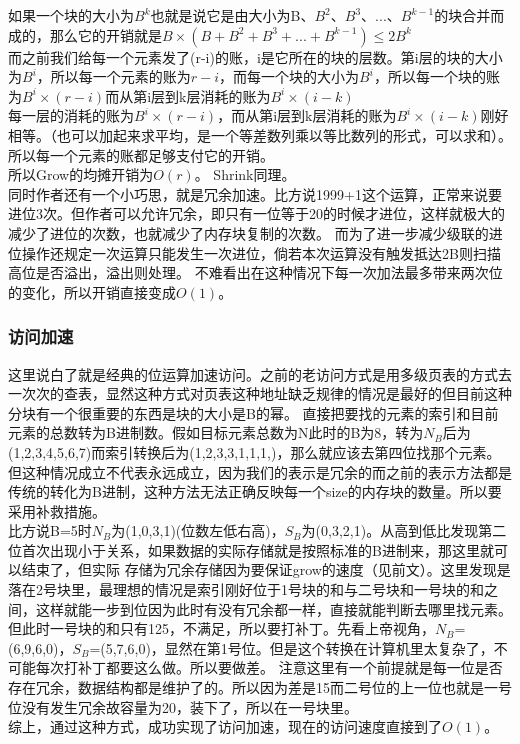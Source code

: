 \documentclass[12pt,a4paper]{article}
\begin{document}
如果一个块的大小为$B^{k}$也就是说它是由大小为B、$B^{2}$、$B^{3}$、...、$B^{k-1}$的块合并而成的，那么它的开销就是$B\times (B+B^{2}+B^{3}+...+B^{k-1})\le2B^{k}$\\
而之前我们给每一个元素发了(r-i)的账，i是它所在的块的层数。第i层的块的大小为$B^{i}$，所以每一个元素的账为$r-i$，而每一个块的大小为$B^{i}$，所以每一个块的账为$B^{i}\times (r-i)$而从第i层到k层消耗的账为$B^{i}\times (i-k)$\\
每一层的消耗的账为$B^{i}\times (r-i)$，而从第i层到k层消耗的账为$B^{i}\times (i-k)$刚好相等。（也可以加起来求平均，是一个等差数列乘以等比数列的形式，可以求和）。
所以每一个元素的账都足够支付它的开销。\\
所以Grow的均摊开销为$O(r)$。
Shrink同理。\\
同时作者还有一个小巧思，就是冗余加速。比方说1999+1这个运算，正常来说要进位3次。但作者可以允许冗余，即只有一位等于20的时候才进位，这样就极大的减少了进位的次数，也就减少了内存块复制的次数。
而为了进一步减少级联的进位操作还规定一次运算只能发生一次进位，倘若本次运算没有触发抵达2B则扫描高位是否溢出，溢出则处理。
不难看出在这种情况下每一次加法最多带来两次位的变化，所以开销直接变成$O(1)$。
\subsubsection{访问加速}
这里说白了就是经典的位运算加速访问。之前的老访问方式是用多级页表的方式去一次次的查表，显然这种方式对页表这种地址缺乏规律的情况是最好的但目前这种分块有一个很重要的东西是块的大小是B的幂。
直接把要找的元素的索引和目前元素的总数转为B进制数。假如目标元素总数为N此时的B为8，转为$N_B$后为(1,2,3,4,5,6,7)而索引转换后为(1,2,3,3,1,1,1,)，那么就应该去第四位找那个元素。
但这种情况成立不代表永远成立，因为我们的表示是冗余的而之前的表示方法都是传统的转化为B进制，这种方法无法正确反映每一个size的内存块的数量。所以要采用补救措施。\\
比方说B=5时$N_B$为(1,0,3,1)(位数左低右高)，$S_B$为(0,3,2,1)。从高到低比发现第二位首次出现小于关系，如果数据的实际存储就是按照标准的B进制来，那这里就可以结束了，但实际
存储为冗余存储因为要保证grow的速度（见前文）。这里发现是落在2号块里，最理想的情况是索引刚好位于1号块的和与二号块和一号块的和之间，这样就能一步到位因为此时有没有冗余都一样，直接就能判断去哪里找元素。
但此时一号块的和只有125，不满足，所以要打补丁。先看上帝视角，$N_B$=(6,9,6,0)，$S_B$=(5,7,6,0)，显然在第1号位。但是这个转换在计算机里太复杂了，不可能每次打补丁都要这么做。所以要做差。
注意这里有一个前提就是每一位是否存在冗余，数据结构都是维护了的。所以因为差是15而二号位的上一位也就是一号位没有发生冗余故容量为20，装下了，所以在一号块里。\\
综上，通过这种方式，成功实现了访问加速，现在的访问速度直接到了$O(1)$。
\end{document}
